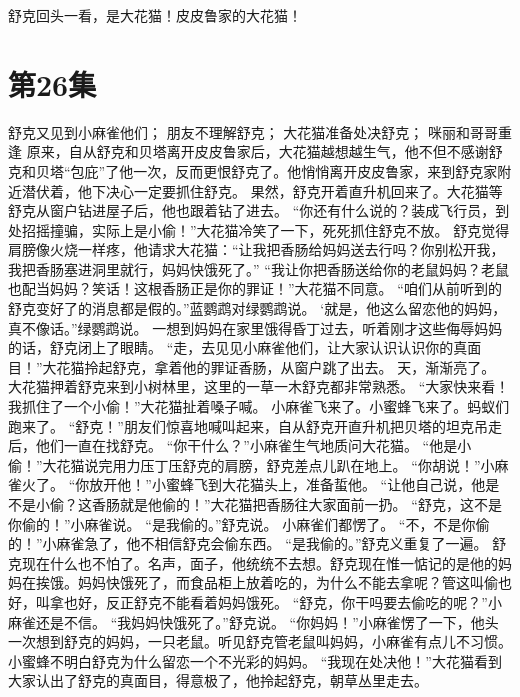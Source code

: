 \documentclass[a4paper,12pt,UTF8,twoside]{ctexbook}
\begin{document}
        舒克回头一看，是大花猫！皮皮鲁家的大花猫！   \chapter{第26集} 
        舒克又见到小麻雀他们； 
        朋友不理解舒克； 
        大花猫准备处决舒克； 
        咪丽和哥哥重逢   
        原来，自从舒克和贝塔离开皮皮鲁家后，大花猫越想越生气，他不但不感谢舒克和贝塔“包庇”了他一次，反而更恨舒克了。他悄悄离开皮皮鲁家，来到舒克家附近潜伏着，他下决心一定要抓住舒克。 
        果然，舒克开着直升机回来了。大花猫等舒克从窗户钻进屋子后，他也跟着钻了进去。 
        “你还有什么说的？装成飞行员，到处招摇撞骗，实际上是小偷！”大花猫冷笑了一下，死死抓住舒克不放。 
        舒克觉得肩膀像火烧一样疼，他请求大花猫：“让我把香肠给妈妈送去行吗？你别松开我，我把香肠塞进洞里就行，妈妈快饿死了。” 
        “我让你把香肠送给你的老鼠妈妈？老鼠也配当妈妈？笑话！这根香肠正是你的罪证！”大花猫不同意。 
        “咱们从前听到的舒克变好了的消息都是假的。”蓝鹦鹉对绿鹦鹉说。 
        ‘就是，他这么留恋他的妈妈，真不像话。”绿鹦鹉说。 
        一想到妈妈在家里饿得昏丁过去，听着刚才这些侮辱妈妈的话，舒克闭上了眼睛。 
        “走，去见见小麻雀他们，让大家认识认识你的真面目！”大花猫拎起舒克，拿着他的罪证香肠，从窗户跳了出去。 
        天，渐渐亮了。 
        大花猫押着舒克来到小树林里，这里的一草一木舒克都非常熟悉。 
        “大家快来看！我抓住了一个小偷！”大花猫扯着嗓子喊。 
        小麻雀飞来了。小蜜蜂飞来了。蚂蚁们跑来了。 
        “舒克！”朋友们惊喜地喊叫起来，自从舒克开直升机把贝塔的坦克吊走后，他们一直在找舒克。 
        “你干什么？”小麻雀生气地质问大花猫。 
        “他是小偷！”大花猫说完用力压丁压舒克的肩膀，舒克差点儿趴在地上。 
        “你胡说！”小麻雀火了。 
        “你放开他！”小蜜蜂飞到大花猫头上，准备蜇他。 
        “让他自己说，他是不是小偷？这香肠就是他偷的！”大花猫把香肠往大家面前一扔。 
        “舒克，这不是你偷的！”小麻雀说。 
        “是我偷的。”舒克说。 
        小麻雀们都愣了。 
        “不，不是你偷的！”小麻雀急了，他不相信舒克会偷东西。 
        “是我偷的。”舒克义重复了一遍。 
        舒克现在什么也不怕了。名声，面子，他统统不去想。舒克现在惟一惦记的是他的妈妈在挨饿。妈妈快饿死了，而食品柜上放着吃的，为什么不能去拿呢？管这叫偷也好，叫拿也好，反正舒克不能看着妈妈饿死。 
        “舒克，你干吗要去偷吃的呢？”小麻雀还是不信。 
        “我妈妈快饿死了。”舒克说。 
        “你妈妈！”小麻雀愣了一下，他头一次想到舒克的妈妈，一只老鼠。听见舒克管老鼠叫妈妈，小麻雀有点儿不习惯。 
        小蜜蜂不明白舒克为什么留恋一个不光彩的妈妈。 
        “我现在处决他！”大花猫看到大家认出了舒克的真面目，得意极了，他拎起舒克，朝草丛里走去。 
\end{document}
